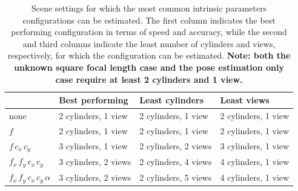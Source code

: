 \begin{table}
      \centering
      \begin{tabularx}{\textwidth}{l X X X}
        \toprule
                 & \textbf{Best performing} & \textbf{Least cylinders} & \textbf{Least views} \\
        \midrule
        none                  & 2 cylinders, 1 view & 2 cylinders, 1 view & 2 cylinders, 1 view \\
        $f$                  & 2 cylinders, 1 view & 2 cylinders, 1 view & 2 cylinders, 1 view \\
        $f\, c_x\, c_y$      & 3 cylinders, 1 view & 2 cylinders, 2 views & 3 cylinders, 1 view \\
        $f_x\, f_y\, c_x\, c_y$ & 3 cylinders, 2 views & 2 cylinders, 4 views & 4 cylinders, 1 view \\
        $f_x\, f_y\, c_x\, c_y\, \alpha$ & 3 cylinders, 2 views & 2 cylinders, 5 views & 4 cylinders, 1 view \\
        \bottomrule
      \end{tabularx}
      \caption{
        Scene settings for which the most common intrinsic parameters configurations can be estimated.
        The first column indicates the best performing configuration in terms of speed and accuracy, while the second and third columns indicate the least number of cylinders and views, respectively, for which the configuration can be estimated.
        \bf{Note: both the unknown square focal length case and the pose estimation only case require at least 2 cylinders and 1 view.}
      }
      \label{tab:intrinsics_configurations}
\end{table}